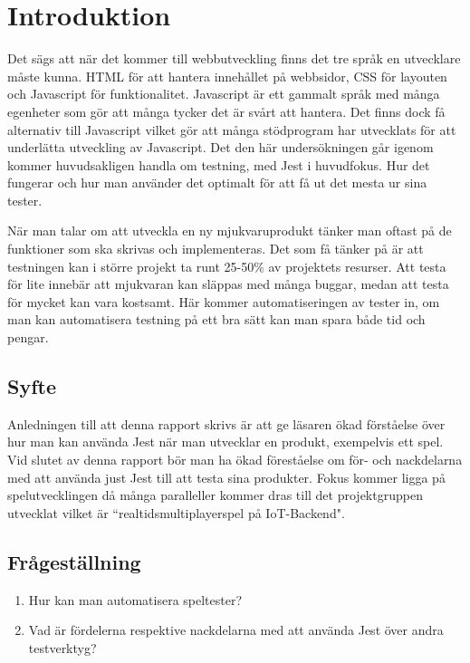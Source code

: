 \section{Introduktion}
\label{sec:david-introduction}

Det sägs att när det kommer till webbutveckling finns det tre språk en utvecklare måste kunna. HTML för att hantera innehållet på webbsidor, CSS för layouten och Javascript för funktionalitet. Javascript är ett gammalt språk med många egenheter som gör att många tycker det är svårt att hantera. Det finns dock få alternativ till Javascript vilket gör att många stödprogram har utvecklats för att underlätta utveckling av Javascript. Det den här undersökningen går igenom kommer huvudsakligen handla om testning, med Jest\cite{bib-jest} i huvudfokus. Hur det fungerar och hur man använder det optimalt för att få ut det mesta ur sina tester.

När man talar om att utveckla en ny mjukvaruprodukt tänker man oftast på de funktioner som ska skrivas och implementeras. Det som få tänker på är att testningen kan i större projekt ta runt 25-50\%\cite{ADP} av projektets resurser. Att testa för lite innebär att mjukvaran kan släppas med många buggar, medan att testa för mycket kan vara kostsamt. Här kommer automatiseringen av tester in, om man kan automatisera testning på ett bra sätt kan man spara både tid och pengar.

\subsection{Syfte}
Anledningen till att denna rapport skrivs är att ge läsaren ökad förståelse över hur man kan använda Jest när man utvecklar en produkt, exempelvis ett spel. Vid slutet av denna rapport bör man ha ökad föreståelse om för- och nackdelarna med att använda just Jest till att testa sina produkter. Fokus kommer ligga på spelutvecklingen då många paralleller kommer dras till det projektgruppen utvecklat vilket är ``realtidsmultiplayerspel på IoT-Backend".




\subsection{Frågeställning}
\label{subsec:david-research-questions}

\begin{enumerate}
\item Hur kan man automatisera speltester?
\item Vad är fördelerna respektive nackdelarna med att använda Jest över andra testverktyg?

\end{enumerate}

